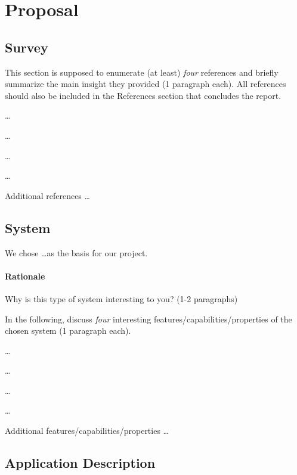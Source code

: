 \section{Proposal}
\label{sec:cp1-proposal}

\subsection{Survey}
\label{subsec:cp1-survey}

This section is supposed to enumerate (at least) \emph{four} references and briefly summarize the main insight they provided (1 paragraph each). All references should also be included in the References section that concludes the report.

\begin{packed_enum}
   \item \ldots
   \item \ldots
   \item \ldots
   \item \ldots
   \item Additional references \ldots
\end{packed_enum}

\subsection{System}
\label{subsec:cp1-system}

We chose \ldots as the basis for our project.

\paragraph{Rationale} Why is this type of system interesting to you? (1-2 paragraphs)

In the following, discuss \emph{four} interesting features/capabilities/properties of the chosen system (1 paragraph each).
\begin{packed_enum}
    \item \ldots
    \item \ldots
    \item \ldots
    \item \ldots
    \item Additional features/capabilities/properties \ldots
\end{packed_enum}

\subsection{Application Description}
\label{subsec:cp1-application-description}

